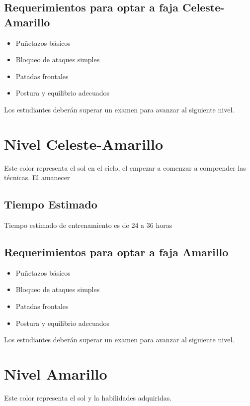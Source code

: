 \subsection{Requerimientos para optar a faja Celeste-Amarillo}

\begin{itemize}
	\item Puñetazos básicos
	\item Bloqueo de ataques simples
	\item Patadas frontales
	\item Postura y equilibrio adecuados
\end{itemize}

Los estudiantes deberán superar un examen para avanzar al siguiente nivel.

\section{Nivel Celeste-Amarillo}
Este color representa el sol en el cielo, el empezar a comenzar a comprender las técnicas. El amanecer

\subsection[Duración]{Tiempo Estimado}

Tiempo estimado de entrenamiento es de 24 a 36 horas

\subsection{Requerimientos para optar a faja Amarillo}

\begin{itemize}
	\item Puñetazos básicos
	\item Bloqueo de ataques simples
	\item Patadas frontales
	\item Postura y equilibrio adecuados
\end{itemize}

Los estudiantes deberán superar un examen para avanzar al siguiente nivel.

\section{Nivel Amarillo}

Este color representa el sol y la habilidades adquiridas.

